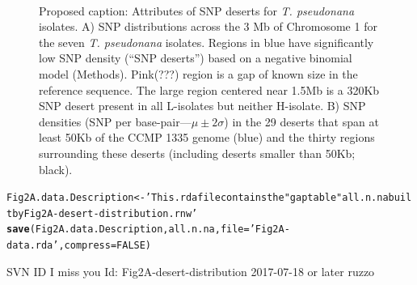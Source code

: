 \documentclass{article}\usepackage[]{graphicx}\usepackage[]{color}
\makeatletter
\newcommand{\hlnum}[1]{\textcolor[rgb]{0.686,0.059,0.569}{#1}}%
\newcommand{\hlstr}[1]{\textcolor[rgb]{0.192,0.494,0.8}{#1}}%
\newcommand{\hlstd}[1]{\textcolor[rgb]{0.345,0.345,0.345}{#1}}%
\newcommand{\hlkwb}[1]{\textcolor[rgb]{0.69,0.353,0.396}{#1}}%
\newcommand{\hlkwc}[1]{\textcolor[rgb]{0.333,0.667,0.333}{#1}}%
\newcommand{\hlkwd}[1]{\textcolor[rgb]{0.737,0.353,0.396}{\textbf{#1}}}%
\newenvironment{kframe}{%
 \def\at@end@of@kframe{}%
 \ifinner\ifhmode%
  \def\at@end@of@kframe{\end{minipage}}%
  \begin{minipage}{\columnwidth}%
 \fi\fi%
 \def\FrameCommand##1{\hskip\@totalleftmargin \hskip-\fboxsep
 \colorbox{shadecolor}{##1}\hskip-\fboxsep
     \hskip-\linewidth \hskip-\@totalleftmargin \hskip\columnwidth}%
 \MakeFramed {\advance\hsize-\width
   \@totalleftmargin\z@ \linewidth\hsize
   \@setminipage}}%
 {\par\unskip\endMakeFramed%
 \at@end@of@kframe}
\newenvironment{knitrout}{}{} %
\makeatother
\begin{document}
\begin{figure}
  \begin{center}
    \\
  \end{center}
  \caption{Proposed caption: Attributes of SNP deserts for {\it T. pseudonana\/} isolates. A) SNP distributions across the 3 Mb of Chromosome 1 for the seven {\it T. pseudonana\/} isolates. Regions in blue have significantly low SNP density (``SNP deserts'') based on a negative binomial model (Methods). Pink(???) region is a gap of known size in the reference sequence. The large region centered near 1.5Mb is a 320Kb SNP desert present in all L-isolates but neither H-isolate. B) SNP densities (SNP per base-pair---$\mu\pm2\sigma$) in the 29 deserts that span at least 50Kb of the CCMP 1335 genome (blue) and the thirty regions surrounding these deserts (including deserts smaller than 50Kb; black).  }
  \label{fig:2a2b}
\end{figure}

\begin{knitrout}\footnotesize
{}\color{fgcolor}\begin{kframe}
\begin{alltt}
\hlstd{Fig2A.data.Description} \hlkwb{<-} \hlstr{'This .rda file contains the "gap table" all.n.na built by Fig2A-desert-distribution.rnw'}
\hlkwd{save}\hlstd{(Fig2A.data.Description, all.n.na,}\hlkwc{file}\hlstd{=}\hlstr{'Fig2A-data.rda'}\hlstd{,}\hlkwc{compress}\hlstd{=}\hlnum{FALSE}\hlstd{)}
\end{alltt}
\end{kframe}
\end{knitrout}

\vfill\footnotesize\flushright SVN ID I miss you $ $Id: Fig2A-desert-distribution 2017-07-18 or later ruzzo $ $
\end{document}
